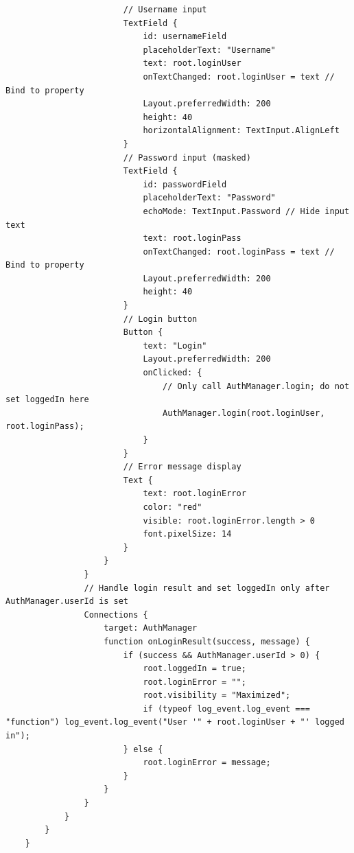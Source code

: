 \documentclass{report}
\begin{document}
\begin{lstlisting}
                        // Username input
                        TextField {
                            id: usernameField
                            placeholderText: "Username"
                            text: root.loginUser
                            onTextChanged: root.loginUser = text // Bind to property
                            Layout.preferredWidth: 200
                            height: 40
                            horizontalAlignment: TextInput.AlignLeft
                        }
                        // Password input (masked)
                        TextField {
                            id: passwordField
                            placeholderText: "Password"
                            echoMode: TextInput.Password // Hide input text
                            text: root.loginPass
                            onTextChanged: root.loginPass = text // Bind to property
                            Layout.preferredWidth: 200
                            height: 40
                        }
                        // Login button
                        Button {
                            text: "Login"
                            Layout.preferredWidth: 200
                            onClicked: {
                                // Only call AuthManager.login; do not set loggedIn here
                                AuthManager.login(root.loginUser, root.loginPass);
                            }
                        }
                        // Error message display
                        Text {
                            text: root.loginError
                            color: "red"
                            visible: root.loginError.length > 0
                            font.pixelSize: 14
                        }
                    }
                }
                // Handle login result and set loggedIn only after AuthManager.userId is set
                Connections {
                    target: AuthManager
                    function onLoginResult(success, message) {
                        if (success && AuthManager.userId > 0) {
                            root.loggedIn = true;
                            root.loginError = "";
                            root.visibility = "Maximized";
                            if (typeof log_event.log_event === "function") log_event.log_event("User '" + root.loginUser + "' logged in");
                        } else {
                            root.loginError = message;
                        }
                    }
                }
            }
        }
    }


\end{lstlisting}
\end{document}
